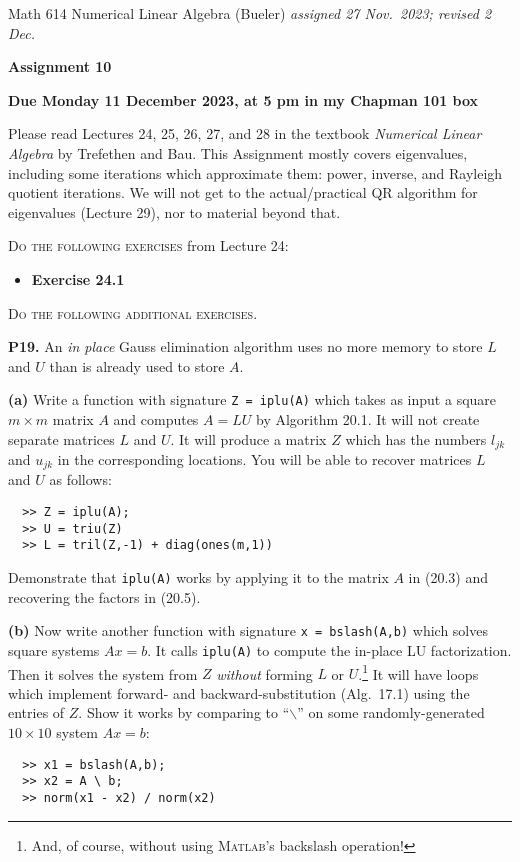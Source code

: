 \documentclass[12pt]{amsart}
\newcommand{\prob}[1]{\bigskip\noindent\textbf{#1.}\quad }
\newcommand{\epart}[1]{\medskip\noindent\textbf{(#1)}\quad }
\newcommand{\Matlab}{\textsc{Matlab}\xspace}
\begin{document}
\scriptsize \noindent Math 614 Numerical Linear Algebra (Bueler) \hfill \emph{assigned 27 Nov.~2023; revised 2 Dec.}
\normalsize\medskip

\Large\centerline{\textbf{Assignment 10}}
\large
\medskip

\centerline{\textbf{Due Monday 11 December 2023, at 5 pm in my Chapman 101 box}}
\medskip
\normalsize

\thispagestyle{empty}

\bigskip
\noindent Please read Lectures 24, 25, 26, 27, and 28 in the textbook \emph{Numerical Linear Algebra} by Trefethen and Bau.  This Assignment mostly covers eigenvalues, including some iterations which approximate them: power, inverse, and Rayleigh quotient iterations.  We will not get to the actual/practical QR algorithm for eigenvalues (Lecture 29), nor to material beyond that.

\bigskip
\noindent \textsc{Do the following exercises} from Lecture 24:

\begin{itemize}
\item \textbf{Exercise 24.1}
\end{itemize}


\bigskip
\noindent \textsc{Do the following additional exercises.}

\prob{P19}   An \emph{in place} Gauss elimination algorithm uses no more memory to store $L$ and $U$ than is already used to store $A$.

\epart{a}  Write a function with signature \verb|Z = iplu(A)| which takes as input a square $m\times m$ matrix $A$ and computes $A=LU$ by Algorithm 20.1.  It will not create separate matrices $L$ and $U$.  It will produce a matrix $Z$ which has the numbers $l_{jk}$ and $u_{jk}$ in the corresponding locations.  You will be able to recover matrices $L$ and $U$ as follows:
\begin{verbatim}
  >> Z = iplu(A);
  >> U = triu(Z)
  >> L = tril(Z,-1) + diag(ones(m,1))
\end{verbatim}
Demonstrate that \verb|iplu(A)| works by applying it to the matrix $A$ in (20.3) and recovering the factors in (20.5).

\epart{b}  Now write another function with signature \verb|x = bslash(A,b)| which solves square systems $Ax=b$.  It calls \texttt{iplu(A)} to compute the in-place LU factorization.  Then it solves the system from $Z$ \emph{without} forming $L$ or $U$.\footnote{And, of course, without using \Matlab's backslash operation!}  It will have loops which implement forward- and backward-substitution (Alg.~17.1) using the entries of $Z$.  Show it works by comparing to ``$\backslash$'' on some randomly-generated $10\times 10$ system $Ax=b$:
\begin{verbatim}
  >> x1 = bslash(A,b);
  >> x2 = A \ b;
  >> norm(x1 - x2) / norm(x2)
\end{verbatim}
\end{document}
